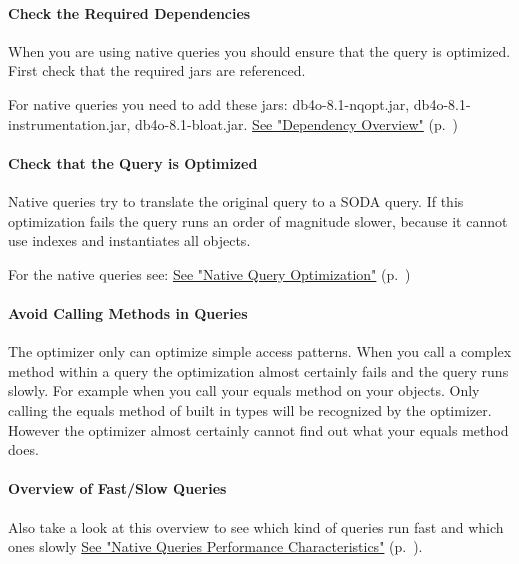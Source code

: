 \paragraph*{Check the Required Dependencies}

When you are using  native queries you should ensure that the query is optimized. First check that the required jars are referenced.

For native queries you need to add these jars: db4o-8.1-nqopt.jar, db4o-8.1-instrumentation.jar, db4o-8.1-bloat.jar. \hyperref[ref:dependency-overview]{See "Dependency Overview"} (p.~\pageref{ref:dependency-overview})

\paragraph*{Check that the Query is Optimized}

Native queries try to translate the original query to a SODA query. If this optimization fails the query runs an order of magnitude slower, because it cannot use indexes and instantiates all objects.

For the native queries see: \hyperref[ref:basics-querying-native-queries-native-query-optimization]{See "Native Query Optimization"} (p.~\pageref{ref:basics-querying-native-queries-native-query-optimization})

\paragraph*{Avoid Calling Methods in Queries}

The optimizer only can optimize simple access patterns. When you call a complex method within a query the optimization almost certainly fails and the query runs slowly. For example when you call your equals method on your objects. Only calling the equals method of built in types will be recognized by the optimizer. However the optimizer almost certainly cannot find out what your equals method does.

\paragraph*{Overview of Fast/Slow Queries}

Also take a look at this overview to see which kind of queries run fast and which ones slowly \hyperref[ref:basics-querying-native-queries-nq-performance-characteristics]{See "Native Queries Performance Characteristics"} (p.~\pageref{ref:basics-querying-native-queries-nq-performance-characteristics}).

